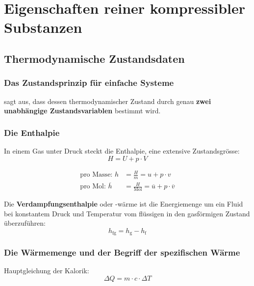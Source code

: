 
\section{Eigenschaften reiner kompressibler Substanzen} %
	
	\subsection{Thermodynamische Zustandsdaten} %
	
		\subsubsection{Das Zustandsprinzip für einfache Systeme} %
		
			sagt aus, dass dessen thermodynamischer Zustand durch genau \textbf{zwei unabhängige Zustandsvariablen} bestimmt wird.
			
		
		\subsubsection{Die Enthalpie} %
			In einem Gas unter Druck steckt die Enthalpie, eine extensive Zustandsgrösse:
			\[
				H = U + p\cdot V
			\]
			
			\begin{align*}
				\text{pro Masse: } h &= \frac{H}{m} = u + p\cdot v \\
				\text{pro Mol: } \overline{h} &= \frac{H}{\text{Mol}} = \overline{u} + p\cdot \overline{v}
			\end{align*}
			
			Die \textbf{Verdampfungsenthalpie} oder -wärme ist die Energiemenge um ein Fluid bei konstantem Druck und Temperatur vom flüssigen in den gasförmigen Zustand überzuführen:
			\[
				h_{\text{fg}} = h_{\text{g}} - h_{\text{f}}
			\]
			
		
		\subsubsection{Die Wärmemenge und der Begriff der spezifischen Wärme} %
			
			Hauptgleichung der Kalorik:
			\[
				\Delta Q = m \cdot c \cdot \Delta T
			\]
			

